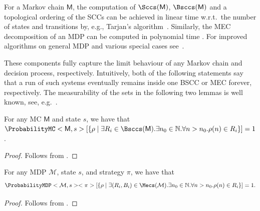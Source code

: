 \documentclass{article}
\newcommand{\Naturals}{\mathbb{N}}
\newcommand{\MC}{\mathsf{M}}
\newcommand{\MDP}{\mathcal{M}}
\newcommand{\infinitepath}{\rho}
\newcommand{\strategy}{\pi}
\begin{document}
\begin{remark} \label{rem:scc_and_mec_decomposition}
	For a Markov chain $\MC$, the computation of $\Sccs(\MC)$, $\Bsccs(\MC)$ and a topological ordering of the SCCs can be achieved in linear time w.r.t.\ the number of states and transitions by, e.g., Tarjan's algorithm~\cite{DBLP:journals/siamcomp/Tarjan72}.
	Similarly, the MEC decomposition of an MDP can be computed in polynomial time \cite{DBLP:journals/jacm/CourcoubetisY95}.
	For improved algorithms on general MDP and various special cases see~\cite{DBLP:conf/soda/ChatterjeeH11,DBLP:conf/soda/ChatterjeeH12,DBLP:journals/jacm/ChatterjeeH14}.
\end{remark}
These components fully capture the limit behaviour of any Markov chain and decision process, respectively.
Intuitively, both of the following statements say that a run of such systems eventually remains inside one BSCC or MEC forever, respectively.
The measurability of the sets in the following two lemmas is well known, see, e.g.\ \cite[Chapter~10]{DBLP:books/daglib/0020348}.
\begin{lemma} \label{stm:mc_almost_sure_absorption}
	For any MC $\MC$ and state $s$, we have that $\ProbabilityMC<\MC, s>[\{\infinitepath \mid \exists R_i \in \Bsccs(\MC). \exists n_0 \in \Naturals. \forall n > n_0. \infinitepath(n) \in R_i\}] = 1$.
\end{lemma}
\begin{proof}
	Follows from \cite[Theorem~10.27]{DBLP:books/daglib/0020348}. 
\end{proof}
\begin{lemma} \label{stm:mdp_almost_sure_absorption}
	For any MDP $\MDP$, state $s$, and strategy $\strategy$, we have that 
	\begin{equation*}
		\ProbabilityMDP<\MDP, s><\strategy>[\{\infinitepath \mid \exists (R_i, B_i) \in \Mecs(\MDP). \exists n_0 \in \Naturals. \forall n > n_0. \infinitepath(n) \in R_i\}] = 1.
	\end{equation*}
\end{lemma}
\begin{proof}
	Follows from \cite[Theorem~3.2]{de1997formal}. 
\end{proof}
\end{document}
